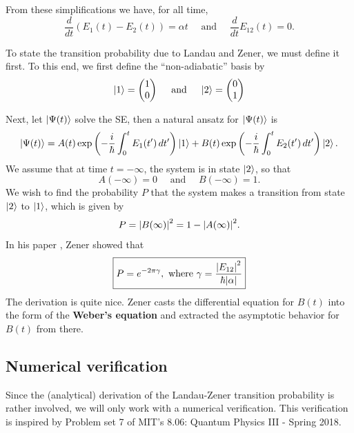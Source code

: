 \documentclass{article}
\theoremstyle{definition}
\newcommand{\al}{\alpha}
\newcommand{\f}[2]{\frac{#1}{#2}}
\newcommand{\lp}{\left(}
\newcommand{\rp}{\right)}
\begin{document}
From these simplifications we have, for all time, 
\begin{equation*}
\f{d}{dt}(E_1(t) - E_2(t)) = \al t \quad \text{ and } \quad \f{d}{dt}{E_{12}(t)} = 0.
\end{equation*}

To state the transition probability due to Landau and Zener, we must define it first. To this end, we first define the ``non-adiabatic'' basis by 
\begin{equation*}
\ket{1} = \begin{pmatrix}
1 \\ 0
\end{pmatrix} \quad \text{ and }  \quad
\ket{2} = \begin{pmatrix}
0 \\ 1
\end{pmatrix}
\end{equation*}

Next, let $\ket{\Psi(t)}$ solve the SE, then a natural ansatz for $\ket{\Psi(t)}$ is 
\begin{equation*}
\ket{\Psi(t)} = A(t) \exp \lp -\f{i}{\hbar}\int_0^{t} E_1(t')\,dt' \rp \ket{1} + B(t) \exp \lp -\f{i}{\hbar}\int_0^{t} E_2(t')\,dt' \rp \ket{2}.
\end{equation*}
We assume that at time $t=-\infty$, the system is in state $\ket{2}$, so that
\begin{equation*}
A(-\infty) = 0 \quad \text{ and } \quad B(-\infty) = 1.
\end{equation*}
We wish to find the probability $P$ that the system makes a transition from state $\ket{2}$ to $\ket{1}$, which is given by 
\begin{equation*}
P = \abs{B(\infty)}^2 = 1- \abs{A(\infty)}^2.
\end{equation*}
In his paper \cite{zener1932non}, Zener showed that 
\begin{equation*}
\boxed{P = e^{-2\pi \gamma}, \text{ where } \gamma = \f{\abs{E_{12}}^2}{\hbar \abs{\al}}} 
\end{equation*}
The derivation is quite nice. Zener casts the differential equation for $B(t)$ into the form of the \textbf{Weber's equation} and extracted the asymptotic behavior for $B(t)$ from there. 


\subsection{Numerical verification}



Since the (analytical) derivation of the Landau-Zener transition probability is rather involved, we will only work with a numerical verification. This verification is inspired by Problem set 7 of MIT's 8.06: Quantum Physics III - Spring 2018. \\
\end{document}
